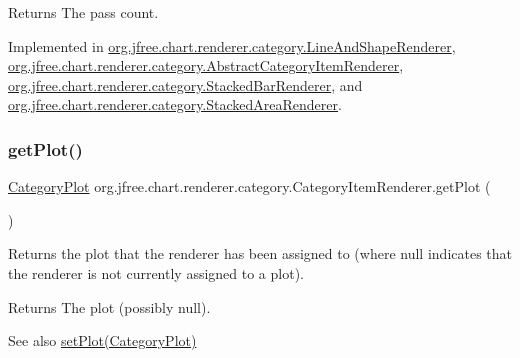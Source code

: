 \begin{DoxyReturn}{Returns}
The pass count. 
\end{DoxyReturn}


Implemented in \mbox{\hyperlink{classorg_1_1jfree_1_1chart_1_1renderer_1_1category_1_1_line_and_shape_renderer_a1bce5bacad7ef3f3582ae42f0d79b5cb}{org.\+jfree.\+chart.\+renderer.\+category.\+Line\+And\+Shape\+Renderer}}, \mbox{\hyperlink{classorg_1_1jfree_1_1chart_1_1renderer_1_1category_1_1_abstract_category_item_renderer_a9386cde1d834a511647d468b68976f64}{org.\+jfree.\+chart.\+renderer.\+category.\+Abstract\+Category\+Item\+Renderer}}, \mbox{\hyperlink{classorg_1_1jfree_1_1chart_1_1renderer_1_1category_1_1_stacked_bar_renderer_a3c4c50f63e052eb83bf1ba4d3865a8a9}{org.\+jfree.\+chart.\+renderer.\+category.\+Stacked\+Bar\+Renderer}}, and \mbox{\hyperlink{classorg_1_1jfree_1_1chart_1_1renderer_1_1category_1_1_stacked_area_renderer_a973bdba1de70a34fcf8f3690d0f91897}{org.\+jfree.\+chart.\+renderer.\+category.\+Stacked\+Area\+Renderer}}.

\mbox{\label{interfaceorg_1_1jfree_1_1chart_1_1renderer_1_1category_1_1_category_item_renderer_a4e97e71b2fb7754a580bf9c29312a9db}} 
\subsubsection{\texorpdfstring{get\+Plot()}{getPlot()}}
{\footnotesize\ttfamily \mbox{\hyperlink{classorg_1_1jfree_1_1chart_1_1plot_1_1_category_plot}{Category\+Plot}} org.\+jfree.\+chart.\+renderer.\+category.\+Category\+Item\+Renderer.\+get\+Plot (\begin{DoxyParamCaption}{ }\end{DoxyParamCaption})}

Returns the plot that the renderer has been assigned to (where {\ttfamily null} indicates that the renderer is not currently assigned to a plot).

\begin{DoxyReturn}{Returns}
The plot (possibly {\ttfamily null}).
\end{DoxyReturn}
\begin{DoxySeeAlso}{See also}
\mbox{\hyperlink{interfaceorg_1_1jfree_1_1chart_1_1renderer_1_1category_1_1_category_item_renderer_a21871e4d309e252c004b96b93914bbc2}{set\+Plot(\+Category\+Plot)}} 
\end{DoxySeeAlso}


